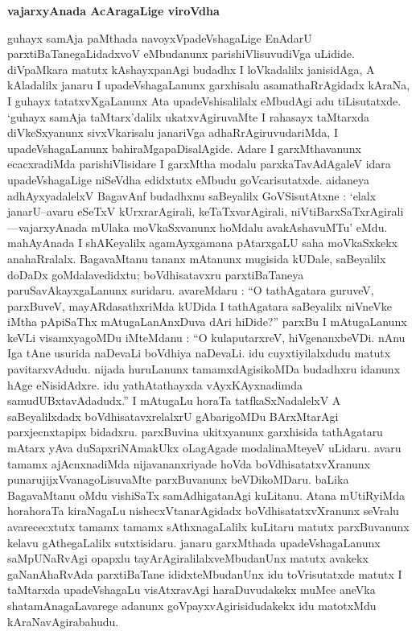 \bigskip
\begin{center}
{\Large\bf vajarxyAnada AcAragaLige viroVdha}
\end{center}

guhayx samAja paMthada navoyxVpadeVshagaLige EnAdarU parxtiBaTanegaLidadxvoV eMbu\-danunx parishiVlisuvudiVga uLidide. diVpaMkara matutx kAshayxpanAgi budadhx I loVkadalilx janisidAga, A kAladalilx janaru I upadeVshagaLanunx garxhisalu asamathaRrAgidadx kAraNa, I guhayx tatatxvXgaLanunx Ata upadeVshisalilalx eMbudAgi adu tiLisutatxde. `guhayx samAja taMtarx'dalilx ukatxvAgiruvaMte I rahasayx taMtarxda diVkeSxyanunx sivxVkarisalu janariVga adhaRrAgiruvudariMda, I upadeVshagaLanunx bahiraMgapaDisalAgide. Adare I garxMthavanunx ecacxradiMda parishiVlisidare I garxMtha modalu parxkaTavAdAgaleV idara upadeVshagaLige niSeVdha edidxtutx eMbudu goVcarisutatxde. aidaneya adhAyxyadalelxV BagavAnf budadhxnu saBeyalilx GoVSisutAtxne : `elalx janarU--avaru eSeTxV kUrxrarAgirali, keTaTxvarAgirali, niVtiBarxSaTxrAgirali---vajarxyAnada mUlaka moVkaSxvanunx hoMdalu avakAshavuMTu' eMdu. mahAyAnada I shAKeyalilx agamAyxgamana pAtarxgaLU saha moVkaSxkekx anahaRralalx. BagavaMtanu tananx mAtanunx mugisida kUDale, saBeyalilx doDaDx goMdalavedidxtu; boVdhisatavxru parxtiBaTaneya paruSavAkayxgaLanunx suridaru. avareMdaru : ``O tathAgatara guruveV, parxBuveV, mayARdasathxriMda kUDida I tathAgatara saBeyalilx niVneVke iMtha pApiSaThx mAtugaLanAnxDuva dAri hiDide?'' parxBu I mAtugaLanunx keVLi visamxyagoMDu iMteMdanu : ``O kulaputarxreV, hiVgenanxbeVDi. nAnu Iga tAne usurida naDevaLi boVdhiya naDevaLi. idu cuyxtiyilalxdudu matutx pavitarxvAdudu. nijada huruLanunx tamamxdAgisikoMDa budadhxru idanunx hAge eNisidAdxre. idu yathAtathayxda vAyxKAyxnadimda samudUBxtavAdadudx.'' I mAtugaLu horaTa tatfkaSxNadalelxV A saBeyalilxdadx boVdhisatavxrelalxrU gAbarigoMDu BArxMtarAgi parxjecnxtapipx bidadxru. parxBuvina ukitxyanunx garxhisida tathAgataru mAtarx yAva duSapxriNAmakUkx oLagAgade modalinaMteyeV uLidaru. avaru tamamx ajAcnxnadiMda nijavananxriyade hoVda boVdhisatatxvXranunx punarujijxVvanagoLisuvaMte parxBuvanunx beVDikoMDaru. baLika BagavaMtanu oMdu vishiSaTx samAdhigatanAgi kuLitanu. Atana mUtiRyiMda horahoraTa kiraNagaLu nishecxVtanarAgidadx boVdhisatatxvXranunx seVralu avarececxtutx tamamx tamamx sAthxnagaLalilx kuLitaru matutx parxBuvanunx kelavu gAthegaLalilx sutxtisidaru. janaru garxMthada upadeVshagaLanunx saMpUNaRvAgi opapxlu tayArAgiralilalxveMbudanUnx matutx avakekx gaNanAhaRvAda parxtiBaTane ididxteMbudanUnx idu toVrisutatxde matutx I taMtarxda upadeVshagaLu visAtxravAgi haraDuvudakekx muMce aneVka shatamAnagaLavarege adanunx goVpayxvAgirisidudakekx idu matotxMdu kAraNavAgirabahudu.


